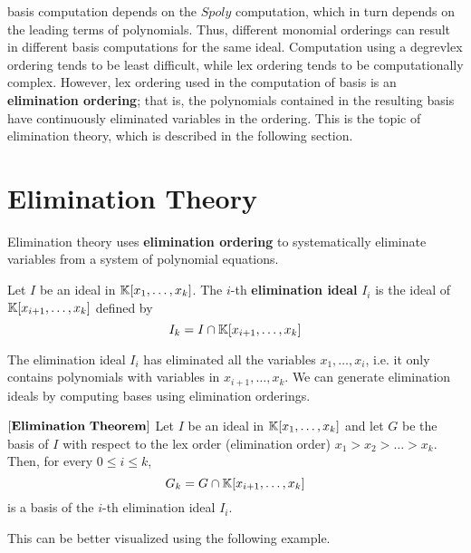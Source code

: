 \Grobner basis computation depends on the $Spoly$ computation, which in turn 
depends on the leading terms of polynomials. Thus, different monomial 
orderings can result in different \Grobner basis computations for the 
same ideal. Computation using a degrevlex ordering tends to be least 
difficult, while lex ordering tends to be computationally complex. However, 
lex ordering used in the computation of \Grobner basis is an {\bf elimination
ordering}; that is, the polynomials contained in the resulting \Grobner basis
have continuously eliminated variables in the ordering. This is the topic of 
elimination theory, which is described in the following section.

\section{Elimination Theory}

Elimination theory uses {\bf elimination ordering} 
to systematically eliminate variables from a system of polynomial
equations.

\begin{Definition}
Let $I$ be an ideal in  ${\mathbb{K}}[x_1,\dots,x_k]$. The $i$-th 
{\bf elimination ideal} $I_i$ is the ideal of ${\mathbb{K}}[x_{i+1},\dots,x_k]$ defined
by
\begin{equation}
I_k = I \cap {\mathbb{K}}[x_{i+1},\dots,x_k]
\end{equation}
\end{Definition}

The elimination ideal $I_i$ has eliminated all the variables 
$x_1,\dots,x_i$, i.e. it only contains polynomials with variables in
$x_{i+1},\dots,x_k$. 
We can generate elimination ideals by computing
\Grobner bases using elimination orderings. 

\begin{Theorem}
$\left[\bf{Elimination\  Theorem}\right]$
Let $I$ be an ideal in ${\mathbb{K}}[x_1,\dots,x_k]$ and let $G$ be the \Grobner 
basis of $I$ with respect to the lex order (elimination order) 
$x_1>x_2>\dots>x_k$. Then, for every $0\leq i\leq k$,
\begin{equation}
G_k=G\cap {\mathbb{K}}[x_{i+1},\dots,x_k]
\end{equation}
is a \Grobner basis of the $i$-th elimination ideal $I_i$.
\label{thm:elimth}
\end{Theorem}

This can be better visualized using the following example.

